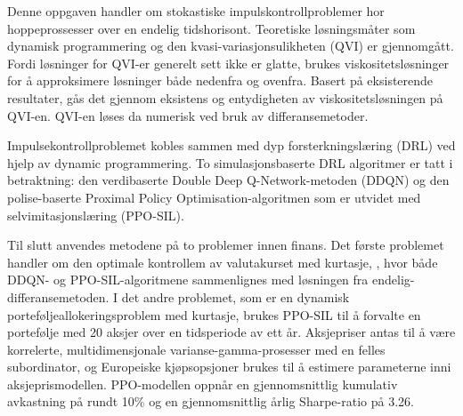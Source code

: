 Denne oppgaven handler om stokastiske impulskontrollproblemer hor hoppeprossesser over en endelig tidshorisont. Teoretiske løsningsmåter som dynamisk programmering og den kvasi-variasjonsulikheten (QVI) er gjennomgått. Fordi løsninger for QVI-er generelt sett ikke er glatte, brukes viskositetsløsninger for å approksimere løsninger både nedenfra og ovenfra. Basert på eksisterende resultater, gås det gjennom eksistens og entydigheten av viskositetsløsningen på QVI-en. QVI-en løses da numerisk ved bruk av differansemetoder. 

Impulsekontrollproblemet kobles sammen med dyp forsterkningslæring (DRL) ved hjelp av dynamic programmering. To simulasjonsbaserte DRL algoritmer er tatt i betraktning: den verdibaserte Double Deep Q-Network-metoden (DDQN) og den polise-baserte Proximal Policy Optimisation-algoritmen som er utvidet med selvimitasjonslæring (PPO-SIL). 

Til slutt anvendes metodene på to problemer innen finans. Det første problemet handler om den optimale kontrollem av valutakurset med kurtasje, , hvor både DDQN- og PPO-SIL-algoritmene sammenlignes med løsningen fra endelig-differansemetoden. I det andre problemet, som er en dynamisk porteføljeallokeringsproblem med kurtasje, brukes PPO-SIL til å forvalte en portefølje med 20 aksjer over en tidsperiode av ett år. Aksjepriser antas til å være korrelerte, multidimensjonale varianse-gamma-prosesser med en felles subordinator, og Europeiske kjøpsopsjoner brukes til å estimere parameterne inni aksjeprismodellen. PPO-modellen oppnår en gjennomsnittlig kumulativ avkastning på rundt 10\% og en gjennomsnittlig årlig Sharpe-ratio på 3.26. 